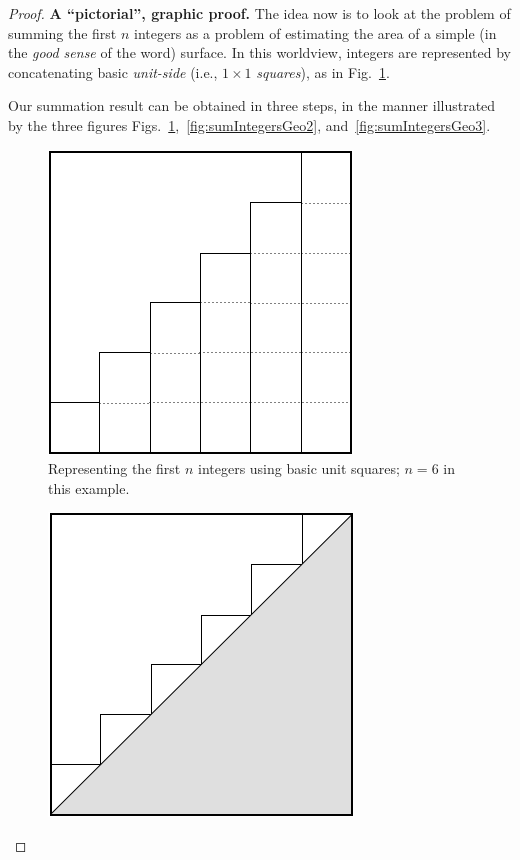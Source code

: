\begin{proof}
{\bf A ``pictorial'', graphic proof.}
%
The idea now is to look at the problem of summing the first $n$
integers as a problem of estimating the area of a simple (in the
\textit{good sense} of the word) surface.  In this worldview, integers
are represented by concatenating basic {\it unit-side} (i.e., $1
\times 1$  {\it squares}), as in
Fig.~\ref{fig:sumIntegersGeo1}.

Our summation result can be obtained in three steps, in the manner
illustrated by the three figures
Figs.~\ref{fig:sumIntegersGeo1},~\ref{fig:sumIntegersGeo2},
and~\ref{fig:sumIntegersGeo3}.
\begin{figure}[ht]
\begin{center}
       \includegraphics[scale=0.4]{FiguresMaths/SumIntegersGeometricBasis}
\caption{Representing the first $n$ integers using basic unit squares; $n=6$ in this example.}
       \label{fig:sumIntegersGeo1}
\end{center}
\end{figure}
\begin{figure}[ht]
\begin{center}
       \includegraphics[scale=0.4]{FiguresMaths/SumIntegersGeometricIntermediate}

\end{center}
\end{figure}
\end{proof}

